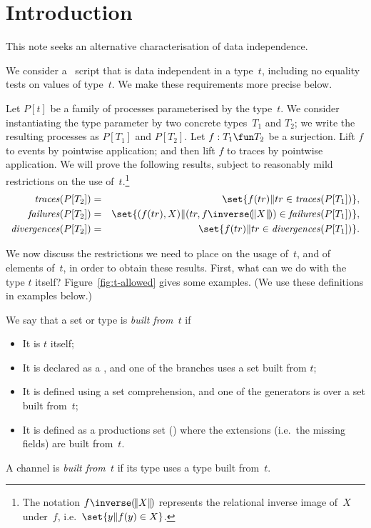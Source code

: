 \section{Introduction}

This note seeks an alternative characterisation of data independence.

We consider a \CSPm\ script that is data independent in a type~$t$, including
no equality tests on values of type~$t$.  We make these requirements more
precise below.

Let $P[t]$ be a family of processes parameterised by the type~$t$.  We
consider instantiating the type parameter by two concrete types~$T_1$ and
$T_2$; we write the resulting processes as $P[T_1]$ and $P[T_2]$.  Let $f: T_1
\fun T_2$ be a surjection.  Lift $f$ to events by pointwise application; and
then lift $f$ to traces by pointwise application.  We will prove the following
results, subject to reasonably mild restrictions on the use
of~$t$.\footnote{The notation $f\inverse \banana{X}$ represents the relational
inverse image of~$X$ under~$f$, i.e.~$\set{y \| f(y) \in X}$.}
%
\begin{eqnarray}
\traces(P[T_2]) & = & \set{f(tr) \| tr \in \traces(P[T_1])},
  \label{eqn:traces} \\
\failures(P[T_2]) & = &
  \set{(f(tr), X) \| (tr, f\inverse \banana{X}) \in \failures(P[T_1])},
  \label{eqn:failures} \\
\divergences(P[T_2]) & = & \set{f(tr) \| tr \in \divergences(P[T_1])}.
\label{eqn:fd}
\end{eqnarray}


We now discuss the restrictions we need to place on the usage of~$t$, and of
elements of~$t$, in order to obtain these results.  First, what can we do with
the type $t$ itself?  Figure~\ref{fig:t-allowed} gives some examples.  (We use
these definitions in examples below.)
\framebox{\ldots} 

\begin{definition}
We say that a set or type is \emph{built from~$t$} if
%
\begin{itemize}
\item It is $t$ itself;

\item It is declared as a , and one of the branches uses a set
  built from $t$;

\item It is defined using a set comprehension, and one of the generators is
  over a set built from~$t$;

\item It is defined as a productions set () where the
extensions (i.e.~the missing fields)  are built from~$t$.
\end{itemize}
%
A channel is \emph{built from~$t$} if its type uses a type built from~$t$.
\end{definition}
 

